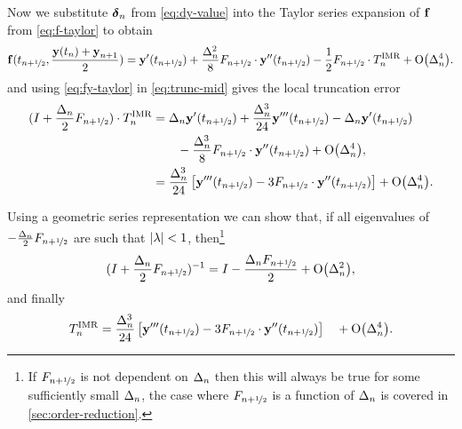 Now we substitute $\dyn$ from \cref{eq:dy-value} into the Taylor series expansion of $\fv$ from \cref{eq:f-taylor} to obtain
\begin{equation}
  \fv(\thf, \frac{\yv(t_n) + \yv_{n+1}}{2}) = \yvhf[']
  + \frac{\dtn^2}{8} \dfdyhf \cdot \yvhf[''] - \frac{1}{2} \dfdyhf \cdot \lte^\imr + \order{\dtn^4}
  . \label{eq:fy-taylor}
\end{equation}
and using \cref{eq:fy-taylor} in \cref{eq:trunc-mid} gives the local truncation error
\begin{equation}
  \begin{aligned}
    (I + \frac{\dtn}{2}\dfdyhf) \cdot\lte^\imr
    &= \dtn \yvhf['] + \frac{\dtn^3}{24} \yvhf['''] - \dtn \yvhf['] \\
    &\qquad- \frac{\dtn^3}{8} \dfdyhf \cdot \yvhf[''] + \order{\dtn^4}, \\
    &= \frac{\dtn^3}{24} \left[\yvhf['''] - 3 \dfdyhf \cdot \yvhf[''] \right]
    + \order{\dtn^4}.
    \label{eq:trunc-implicit-form}
  \end{aligned}
\end{equation}

Using a geometric series representation we can show that, if all eigenvalues of  $-\frac{\dtn}{2}\dfdyhf$ are such that $\abs{\lambda} < 1$, then\footnote{If $\dfdyhf$ is not dependent on $\dtn$ then this will always be true for some sufficiently small $\dtn$, the case where $\dfdyhf$ is a function of $\dtn$ is covered in \cref{sec:order-reduction}.}
\begin{equation}
  (I + \frac{\dtn}{2}\dfdyhf)^{-1} = I - \frac{\dtn \dfdyhf}{2}  + \order{\dtn^2},
\end{equation}
and finally
\begin{equation}
  \lte^\imr = \frac{\dtn^3}{24} \left[\yvhf['''] - 3 \dfdyhf \cdot \yvhf[''] \right]
  \quad +\order{\dtn^4}.
\end{equation}

